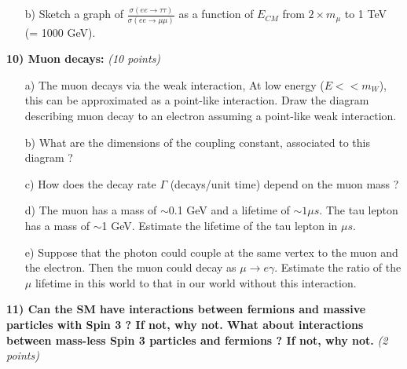 {\begin{itemize}
\item[b)]{
Sketch a graph of $\frac{\sigma(ee\rightarrow\tau\tau)}{\sigma(ee\rightarrow\mu\mu)}$ as a function of $E_{CM}$ from $2\times m_{\mu}$ to 1 TeV (= 1000 GeV).
\vspace*{1in}
}
\end{itemize}





\clearpage

\textbf{10) Muon decays: } \hfill \textit{(10 points)}\\
\begin{itemize}
  \item[a)]{ The muon decays via the weak interaction,  At low energy ($E << m_W$), this can be approximated as a point-like interaction. 
  Draw the diagram describing muon decay to an electron assuming a point-like weak interaction.
\vspace*{1.5in}
}
  \item[b)]{ What are the dimensions of the coupling constant, associated to this diagram  ?
\vspace*{1.0in}
  }
  \item[c)] How does the decay rate $\Gamma$ (decays/unit time)  depend on the muon mass ? 
\vspace*{1.0in}
  \item[d)]{ The muon has a mass of $\sim$0.1 GeV and a lifetime of $\sim 1 \mu s$. The tau lepton has a mass of {$\sim$1 GeV}. Estimate the lifetime of the tau lepton in $\mu s$.
\vspace*{2.4in}
}
  \item[e)] {Suppose that the photon could couple at the same vertex to the muon and the electron. Then the muon could decay as $\mu\rightarrow e \gamma$. 
  Estimate the ratio of the $\mu$ lifetime in this world to that in our world without this interaction.
  \vspace*{3.0in}
  }
\end{itemize}

\textbf{11) Can the SM have interactions between fermions and massive particles with Spin 3 ? If not, why not.  What about interactions between mass-less Spin 3 particles and fermions ? If not, why not. }\hfill \textit{(2 points)}\\

}

